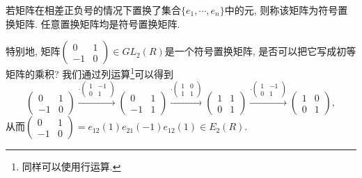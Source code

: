\begin{definition}
	若矩阵在相差正负号的情况下置换了集合$\{e_1,\cdots, e_n\}$中的元, 则称该矩阵为符号置换矩阵. 任意置换矩阵均是符号置换矩阵.
\end{definition}
特别地, 矩阵$\begin{pmatrix}
	0 & 1\\ -1 & 0
\end{pmatrix}\in GL_2(R)$是一个符号置换矩阵, 是否可以把它写成初等矩阵的乘积? 我们通过列运算\footnote{同样可以使用行运算.}可以得到
\[\begin{pmatrix}
	0 & 1\\ -1 & 0
\end{pmatrix}\overset{\cdot \begin{pmatrix}
	1 & -1\\ 0 & 1
\end{pmatrix}}\longrightarrow \begin{pmatrix}
	0 & 1\\ -1 & 1
\end{pmatrix}\overset{\cdot\begin{pmatrix}
	1 & 0\\ 1 & 1
\end{pmatrix}}\longrightarrow \begin{pmatrix}
	1 & 1\\ 0 & 1
\end{pmatrix}\overset{\cdot\begin{pmatrix}
	1 & -1\\ 0 & 1
\end{pmatrix}}\longrightarrow \begin{pmatrix}
	1 & 0\\ 0 & 1
\end{pmatrix},\]
从而$\begin{pmatrix}
	0 & 1\\ -1 & 0
\end{pmatrix}=e_{12}(1)e_{21}(-1)e_{12}(1)\in E_2(R)$.

